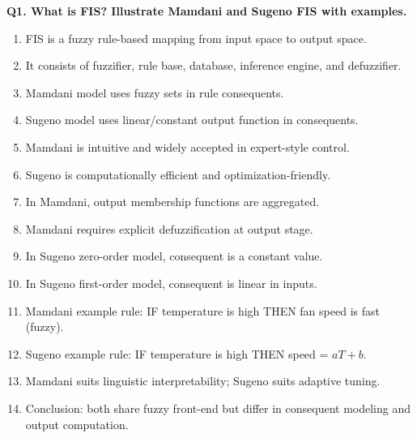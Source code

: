 \documentclass[11pt,a4paper]{article}
\begin{document}
\textbf{Q1. What is FIS? Illustrate Mamdani and Sugeno FIS with examples.}
\begin{enumerate}
\item FIS is a fuzzy rule-based mapping from input space to output space.
\item It consists of fuzzifier, rule base, database, inference engine, and defuzzifier.
\item Mamdani model uses fuzzy sets in rule consequents.
\item Sugeno model uses linear/constant output function in consequents.
\item Mamdani is intuitive and widely accepted in expert-style control.
\item Sugeno is computationally efficient and optimization-friendly.
\item In Mamdani, output membership functions are aggregated.
\item Mamdani requires explicit defuzzification at output stage.
\item In Sugeno zero-order model, consequent is a constant value.
\item In Sugeno first-order model, consequent is linear in inputs.
\item Mamdani example rule: IF temperature is high THEN fan speed is fast (fuzzy).
\item Sugeno example rule: IF temperature is high THEN speed = $aT+b$.
\item Mamdani suits linguistic interpretability; Sugeno suits adaptive tuning.
\item Conclusion: both share fuzzy front-end but differ in consequent modeling and output computation.
\end{enumerate}
\end{document}
